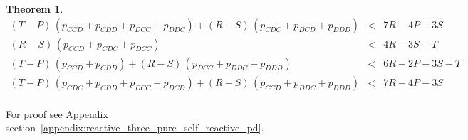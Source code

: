 \documentclass[11pt]{article}
\theoremstyle{plainCl1}
\newtheorem{theorem}{Theorem}[section]
\theoremstyle{plainCl2}
\begin{document}
\begin{theorem}
\begin{equation*}
\begin{array}{ccc}
    (T - P)\,(p_{CCD} + p_{CDD} + p_{DCC} + p_{DDC}) + (R - S)\,(p_{CDC} + p_{DCD} + p_{DDD}) & < & 7 R - 4 P - 3 S \\ [0.2cm]
    (R - S)\,(p_{CCD} + p_{CDC} + p_{DCC}) & < & 4 R - 3 S - T \\ [0.2cm]
    (T - P)\,(p_{CCD} + p_{CDD}) + (R - S)\,(p_{DCC} + p_{DDC} + p_{DDD}) & < & 6 R - 2 P - 3 S - T \\ [0.2cm]
    (T - P)\,(p_{CDC} + p_{CDD} + p_{DCC} + p_{DCD}) + (R - S)\,(p_{CCD} + p_{DDC} + p_{DDD}) & < & 7 R - 4 P - 3 S \\ [0.2cm]
    \end{array}
\end{equation*}
\end{theorem}

For proof see Appendix section~\ref{appendix:reactive_three_pure_self_reactive_pd}.


\clearpage
\newpage

\appendix

\end{document}
